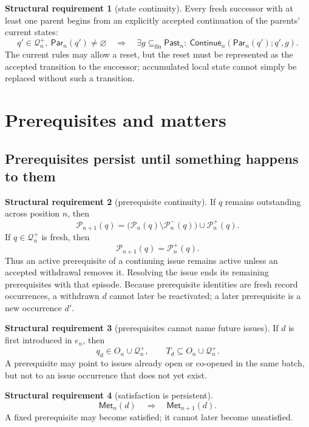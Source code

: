 \documentclass[11pt]{article}
\theoremstyle{definition}
\newtheorem{requirement}{Structural requirement}
\theoremstyle{remark}
\newcommand{\fin}{\subseteq_{\mathrm{fin}}}
\newcommand{\Past}{\mathsf{Past}}
\newcommand{\Continue}{\mathsf{Continue}}
\newcommand{\Met}{\mathsf{Met}}
\newcommand{\Pre}{\mathcal P}
\newcommand{\Par}{\mathsf{Par}}
\newcommand{\Born}{\mathcal Q^{+}}
\begin{document}
\begin{requirement}[state continuity]\label{req:state}
Every fresh successor with at least one parent begins from an explicitly
accepted continuation of the parents' current states:
\[
 q'\in\Born_n,\ \Par_n(q')\neq\varnothing
 \quad\Longrightarrow\quad
 \exists g\fin\Past_n:\ \Continue_n(\Par_n(q');q',g).
\]
The current rules may allow a reset, but the reset must be represented as the
accepted transition to the successor; accumulated local state cannot simply be
replaced without such a transition.
\end{requirement}

\section{Prerequisites and matters}\label{sec:matters}

\subsection{Prerequisites persist until something happens to them}

\begin{requirement}[prerequisite continuity]\label{req:pre-continuity}
If $q$ remains outstanding across position $n$, then
\[
 \Pre_{n+1}(q)
 =\bigl(\Pre_n(q)\setminus\Pre_n^-(q)\bigr)\cup\Pre_n^+(q).
\]
If $q\in\Born_n$ is fresh, then
\[
 \Pre_{n+1}(q)=\Pre_n^+(q).
\]
Thus an active prerequisite of a continuing issue remains active unless an
accepted withdrawal removes it. Resolving the issue ends its remaining
prerequisites with that episode. Because prerequisite identities are fresh
record occurrences, a withdrawn $d$ cannot later be reactivated; a later
prerequisite is a new occurrence $d'$.
\end{requirement}

\begin{requirement}[prerequisites cannot name future issues]\label{req:pre-refs}
If $d$ is first introduced in $e_n$, then
\[
 q_d\in O_n\cup\Born_n,
 \qquad
 T_d\subseteq O_n\cup\Born_n.
\]
A prerequisite may point to issues already open or co-opened in the same
batch, but not to an issue occurrence that does not yet exist.
\end{requirement}

\begin{requirement}[satisfaction is persistent]\label{req:met}
\[
 \Met_n(d)\quad\Longrightarrow\quad\Met_{n+1}(d).
\]
A fixed prerequisite may become satisfied; it cannot later become unsatisfied.
\end{requirement}
\end{document}
